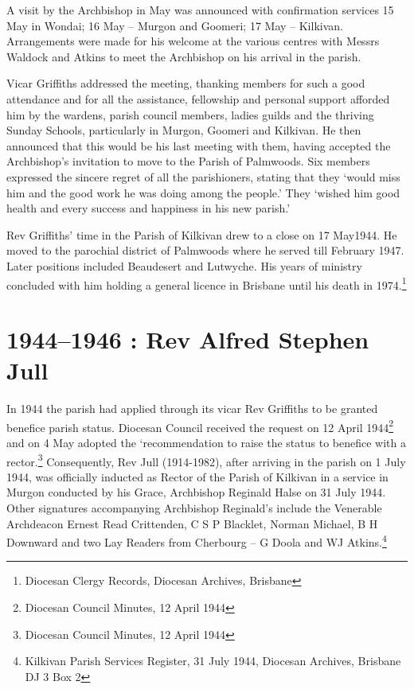 A visit by the Archbishop in May was announced with confirmation
services 15 May in Wondai; 16 May -- Murgon and Goomeri; 17 May --
Kilkivan. Arrangements were made for his welcome at the various centres
with Messrs Waldock and Atkins to meet the Archbishop on his arrival in
the parish.

Vicar Griffiths addressed the meeting, thanking members for such a good
attendance and for all the assistance, fellowship and personal support
afforded him by the wardens, parish council members, ladies guilds and
the thriving Sunday Schools, particularly in Murgon, Goomeri and
Kilkivan. He then announced that this would be his last meeting with
them, having accepted the Archbishop's invitation to move to the Parish
of Palmwoods. Six members expressed the sincere regret of all the
parishioners, stating that they `would miss him and the good work he was
doing among the people.' They `wished him good health and every success
and happiness in his new parish.'

Rev Griffiths' time in the Parish of Kilkivan drew to a close on 17
May1944. He moved to the parochial district of Palmwoods where he served
till February 1947. Later positions included Beaudesert and Lutwyche.
His years of ministry concluded with him holding a general licence in
Brisbane until his death in 1974.\footnote{Diocesan Clergy Records,
  Diocesan Archives, Brisbane}

\printendnotes
\setcounter{endnote}{0}
\chapter{1944--1946 : Rev Alfred Stephen
Jull}

In 1944 the parish had applied through its vicar Rev Griffiths to be
granted benefice parish status. Diocesan Council received the request on
12 April 1944\footnote{Diocesan Council Minutes, 12 April 1944} and on 4
May adopted the `recommendation to raise the status to benefice with a
rector.\footnote{Diocesan Council Minutes, 12 April 1944} Consequently,
Rev Jull (1914-1982), after arriving in the parish on 1 July 1944, was
officially inducted as Rector of the Parish of Kilkivan in a service in
Murgon conducted by his Grace, Archbishop Reginald Halse on 31 July
1944. Other signatures accompanying Archbishop Reginald's include the
Venerable Archdeacon Ernest Read Crittenden, C S P Blacklet, Norman
Michael, B H Downward and two Lay Readers from Cherbourg -- G Doola and
WJ Atkins.\footnote{Kilkivan Parish Services Register, 31 July 1944,
  Diocesan Archives, Brisbane DJ 3 Box 2}

